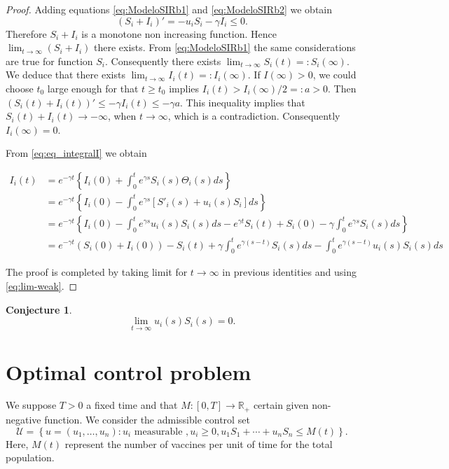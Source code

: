 \documentclass[a4paper,10pt]{article}
\newtheorem{conj}[thm]{Conjecture}
\theoremstyle{remark}
\begin{document}
\begin{proof} Adding equations \eqref{eq:ModeloSIRb1} and \eqref{eq:ModeloSIRb2} we obtain 
\[
 (S_i+I_i)'=- u_iS_i-\gamma I_i\leq 0.
\]
Therefore  $S_i+I_i$ is a monotone non increasing function. Hence $\lim_{t\to\infty} (S_i+I_i)$ there exists. From \eqref{eq:ModeloSIRb1} the same considerations are true for function $S_i$. Consequently there exists $\lim_{t\to\infty} S_i(t)=:S_i(\infty)$. We deduce that there exists  $\lim_{t\to\infty} I_i(t)=:I_i(\infty)$. If $I(\infty)>0$, we could choose $t_0$ large enough for that $t\geq t_0$ implies $I_i(t)>I_i(\infty)/2=:a>0$. Then $(S_i(t)+I_i(t))'\leq -\gamma I_i(t)\leq -\gamma a$. This inequality implies that $S_i(t) +I_i(t)\to -\infty$, when $t\to\infty$, which is a contradiction. Consequently $I_i(\infty)=0$. 

 
From  \eqref{eq:eq_integralI} we obtain 


\[
\begin{split}
 I_i(t)&=e^{-\gamma t}
 \left\{
    I_i(0)+\int_0^t e^{\gamma s} S_{i}(s) \Theta_i(s)ds
\right\}\\
&= e^{-\gamma t}
 \left\{
    I_i(0)-\int_0^t e^{\gamma s} \left[S'_i(s)+ u_i(s)S_i\right]ds 
  \right\}\\
  &= e^{-\gamma t}
 \left\{
    I_i(0)-\int_0^t e^{\gamma s}   u_i(s)S_i(s)ds
    -e^{\gamma t}S_i(t)+S_i(0)-\gamma\int_0^t e^{\gamma s} S_{i}(s) ds 
  \right\}\\
   &= e^{-\gamma t}\left(S_i(0)+ I_i(0)  \right)-S_i(t)
   +\gamma \int_0^t e^{\gamma (s-t)}S_{i}(s)ds-\int_0^t e^{\gamma (s-t)}   u_i(s)S_i(s)ds
 \end{split}
\]

The proof is completed by taking limit for $t\to\infty$ in previous identities and using \eqref{eq:lim-weak}. 
\end{proof}


\begin{conj} 
 \[
 \lim\limits_{t\to\infty}  u_i(s)S_i(s)
=0.
\]

\end{conj}


\section{Optimal control problem}


We suppose $T>0$ a fixed time and that $ M:[0,T]\to\mathbb{R}_+$ certain given non-negative function. We consider the admissible control set
\[\mathscr{U}=\left\{ u=\left( u_{1}, \ldots,  u_{n}\right):  u_{i}\right.\text{ measurable }, \left. u_{i} \geqslant 0,  u_{1}S_{1}+\cdots+ u_{n}S_{n}\leq M(t)\right\}.\]
Here, $ M(t)$ represent the number of vaccines per unit of time for the total population.
\end{document}
